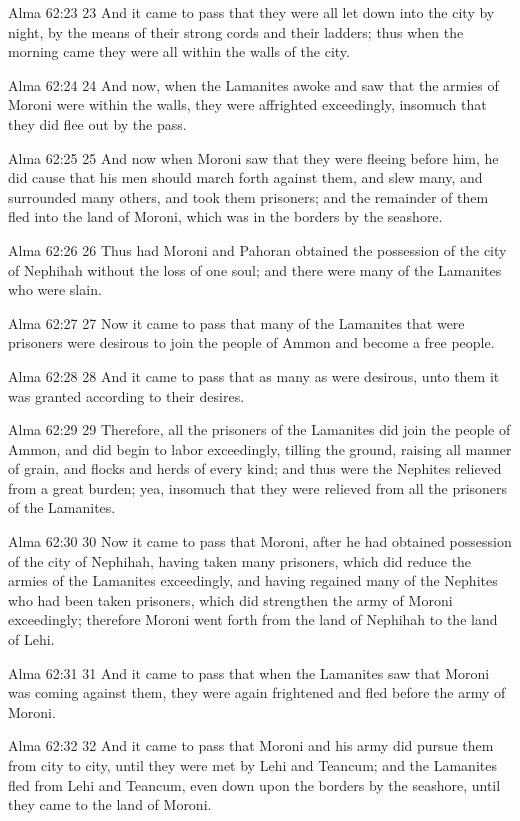 Alma 62:23
 23 And it came to pass that they were all let down into the city
by night, by the means of their strong cords and their ladders;
thus when the morning came they were all within the walls of the
city.

Alma 62:24
 24 And now, when the Lamanites awoke and saw that the armies of
Moroni were within the walls, they were affrighted exceedingly,
insomuch that they did flee out by the pass.

Alma 62:25
 25 And now when Moroni saw that they were fleeing before him, he
did cause that his men should march forth against them, and slew
many, and surrounded many others, and took them prisoners; and
the remainder of them fled into the land of Moroni, which was in
the borders by the seashore.

Alma 62:26
 26 Thus had Moroni and Pahoran obtained the possession of the
city of Nephihah without the loss of one soul; and there were
many of the Lamanites who were slain.

Alma 62:27
 27 Now it came to pass that many of the Lamanites that were
prisoners were desirous to join the people of Ammon and become a
free people.

Alma 62:28
 28 And it came to pass that as many as were desirous, unto them
it was granted according to their desires.

Alma 62:29
 29 Therefore, all the prisoners of the Lamanites did join the
people of Ammon, and did begin to labor exceedingly, tilling the
ground, raising all manner of grain, and flocks and herds of
every kind; and thus were the Nephites relieved from a great
burden; yea, insomuch that they were relieved from all the
prisoners of the Lamanites.

Alma 62:30
 30 Now it came to pass that Moroni, after he had obtained
possession of the city of Nephihah, having taken many prisoners,
which did reduce the armies of the Lamanites exceedingly, and
having regained many of the Nephites who had been taken
prisoners, which did strengthen the army of Moroni exceedingly;
therefore Moroni went forth from the land of Nephihah to the land
of Lehi.

Alma 62:31
 31 And it came to pass that when the Lamanites saw that Moroni
was coming against them, they were again frightened and fled
before the army of Moroni.

Alma 62:32
 32 And it came to pass that Moroni and his army did pursue them
from city to city, until they were met by Lehi and Teancum; and
the Lamanites fled from Lehi and Teancum, even down upon the
borders by the seashore, until they came to the land of Moroni.

